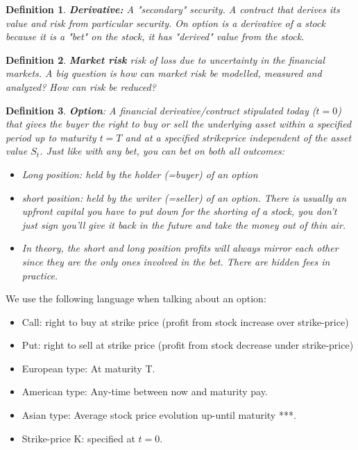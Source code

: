\documentclass{article}
\newtheorem{definition}{Definition}
\begin{document}
\begin{definition}
\textbf{Derivative:} A "secondary" security. A contract that derives its value and risk from  particular security. On option is a derivative of a stock because it is a "bet" on the stock, it has "derived" value from the stock.
\end{definition}

\begin{definition}
\textbf{Market risk} risk of loss due to uncertainty in the financial markets. A big question is how can market risk be modelled, measured and analyzed? How can risk be reduced?
\end{definition}


\begin{definition}
\textbf{Option}: A financial derivative/contract stipulated today ($t=0$) that gives the buyer the right to buy or sell the underlying asset within a specified period up to maturity $t=T$ and at a specified strikeprice independent of the asset value $S_t$. Just like with any bet, you can bet on both all outcomes:
\begin{itemize}
\item Long position: held by the holder (=buyer) of an option
\item short position: held by the writer (=seller) of an option. There is usually an upfront capital you have to put down for the shorting of a stock, you don't just sign you'll give it back in the future and take the money out of thin air. 
\item In theory, the short and long position profits will always mirror each other since they are the only ones involved in the bet. There are hidden fees in practice.
\end{itemize}
\end{definition}

We use the following language when talking about an option: 

\begin{itemize}
\item Call: right to buy at strike price (profit from stock increase over strike-price)
\item Put: right to sell at strike price (profit from stock decrease under strike-price)
\item European type: At maturity T.
\item American type: Any-time between now and maturity pay.
\item Asian type: Average stock price evolution up-until maturity ***.
\item Strike-price K: specified at $t=0$. 
\end{itemize}
\end{document}
